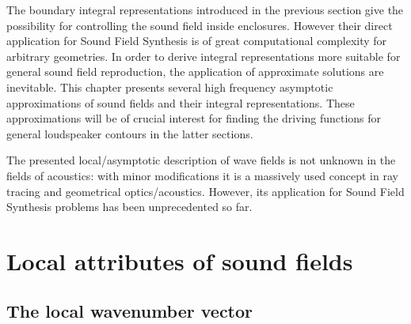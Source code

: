 The boundary integral representations introduced in the previous section give the possibility for controlling the sound field inside enclosures. 
However their direct application for Sound Field Synthesis is of great computational complexity for arbitrary geometries.
In order to derive integral representations more suitable for general sound field reproduction, the application of approximate solutions are inevitable.
This chapter presents several high frequency asymptotic approximations of sound fields and their integral representations.
These approximations will be of crucial interest for finding the driving functions for general loudspeaker contours in the latter sections.

The presented local/asymptotic description of wave fields is not unknown in the fields of acoustics: with minor modifications it is a massively used concept in ray tracing and geometrical optics/acoustics.
However, its application for Sound Field Synthesis problems has been unprecedented so far.

\section{Local attributes of sound fields}
\subsection{The local wavenumber vector}

